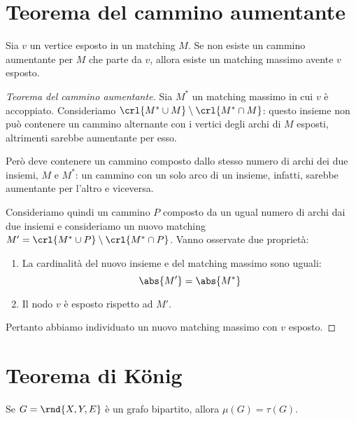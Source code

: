 \documentclass[\main/main.tex]{subfiles}
\begin{document}
\section{Teorema del cammino aumentante}

\begin{theorem}
	Sia \(v\) un vertice esposto in un matching \(M\). Se non esiste un cammino aumentante per \(M\) che parte da \(v\), allora esiste un matching massimo avente \(v\) esposto.
\end{theorem}

\begin{proof}[Teorema del cammino aumentante]
	Sia \(M^*\) un matching massimo in cui \(v\) è accoppiato. Consideriamo \(\crl{M^*\cup M}\setminus\crl{M^* \cap M}\): questo insieme non può contenere un cammino alternante con i vertici degli archi di \(M\) esposti, altrimenti sarebbe aumentante per esso.

	Però deve contenere un cammino composto dallo stesso numero di archi dei due insiemi, \(M\) e \(M^*\): un cammino con un solo arco di un insieme, infatti, sarebbe aumentante per l'altro e viceversa.

	Consideriamo quindi un cammino \(P\) composto da un ugual numero di archi dai due insiemi e consideriamo un nuovo matching \(M' = \crl{M^*\cup P}\setminus\crl{M^* \cap P}\). Vanno osservate due proprietà:

	\begin{enumerate}
		\item La cardinalità del nuovo insieme e del matching massimo sono uguali:
		      \[
			      \abs{M'} = \abs{M^*}
		      \]
		\item Il nodo \(v\) è esposto rispetto ad \(M'\).
	\end{enumerate}
	Pertanto abbiamo individuato un nuovo matching massimo con \(v\) esposto.
\end{proof}

\section{Teorema di König}

\begin{theorem}
	Se \(G=\rnd{X, Y, E}\) è un grafo bipartito, allora \(\mu(G) = \tau(G)\).
\end{theorem}
\end{document}
